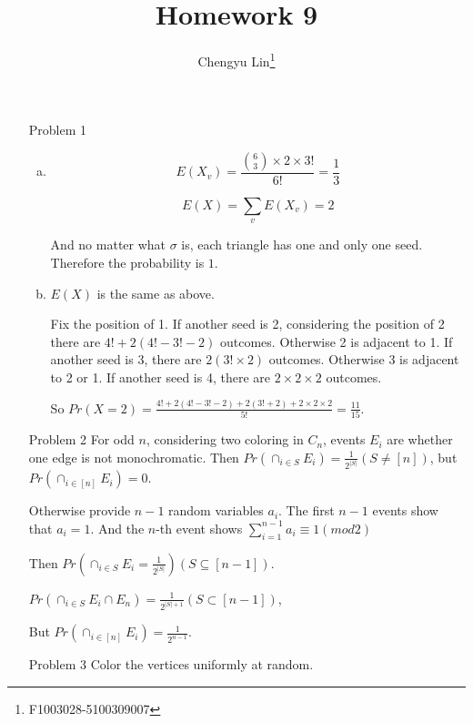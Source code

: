 \documentclass{article}
\title{Homework 9}
\author{Chengyu Lin\footnote{F1003028-5100309007}}
\date{}
\begin{document}
\maketitle

\begin{itemize}
    \item[Problem 1]
        \begin{enumerate}[(a)]
            \item
                $$E(X_v) = \frac{{6 \choose 3} \times 2 \times 3!}{6!} = \frac{1}{3}$$

                $$E(X) = \sum_{v} E(X_v) = 2$$

                And no matter what $\sigma$ is, each triangle has one and only one seed.
                Therefore the probability is $1$.

            \item
                $E(X)$ is the same as above.

                Fix the position of 1. 
                If another seed is 2, considering the position of 2
                there are $4! + 2(4! - 3! - 2)$ outcomes. Otherwise 2 is
                adjacent to 1.
                If another seed is 3, there are $2(3! \times 2)$ outcomes.
                Otherwise 3 is adjacent to 2 or 1.
                If another seed is 4, there are $2 \times 2 \times 2$ outcomes.

                So $Pr(X = 2) = \frac{4! + 2(4! - 3! - 2) + 2(3! + 2) + 2 \times 2 \times 2}{5!} = \frac{11}{15}$.

        \end{enumerate}

    \item[Problem 2]
        For odd $n$, considering two coloring in $C_n$, events ${E_i}$ are
        whether one edge is not monochromatic. 
        Then $Pr(\cap_{i \in S}E_i) = \frac{1}{2^{|S|}} (S \neq [n])$,
        but $Pr(\cap_{i \in [n]}E_i) = 0$.

        Otherwise provide $n - 1$ random variables ${a_i}$.
        The first $n - 1$ events show that $a_i = 1$.
        And the $n$-th event shows $\sum_{i = 1}^{n - 1}a_i \equiv 1 (mod 2)$

        Then $Pr(\cap_{i \in S} E_i = \frac{1}{2^{|S|}}) (S \subseteq [n-1])$.

            $Pr(\cap_{i \in S} E_i \cap E_n) = \frac{1}{2^{|S| + 1}} (S \subset [n - 1])$, 

            But $Pr(\cap_{i \in [n]}E_i) = \frac{1}{2^{n-1}}$.
    \item[Problem 3]
        Color the vertices uniformly at random.


\end{itemize}
\end{document}
